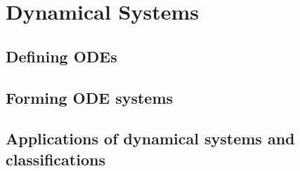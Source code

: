 \chapter{Dynamical Systems}
\label{chap:ch3}


\section{Defining ODEs}

\section{Forming ODE systems}

\section{Applications of dynamical systems and classifications}